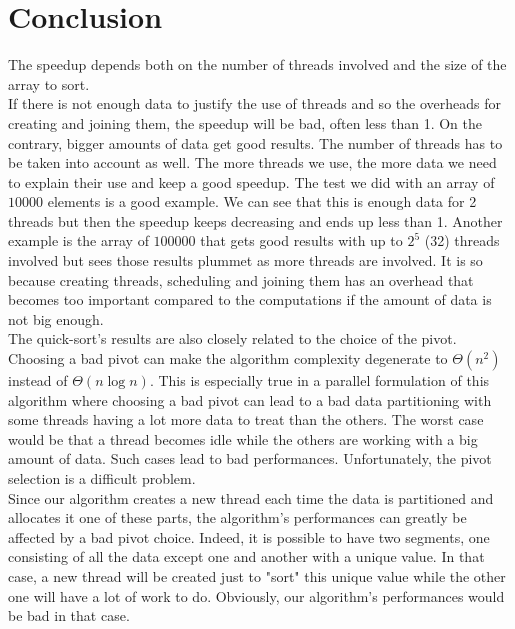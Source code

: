 \chapter{Conclusion}

The speedup depends both on the number of threads involved and the size of the array to sort.\\ 

If there is not enough data to justify the use of threads and so the overheads for creating and joining them, the speedup will be bad, often less than 1. On the contrary, bigger amounts of data get good results. The number of threads has to be taken into account as well. The more threads we use, the more data we need to explain their use and keep a good speedup. The test we did with an array of $10000$ elements is a good example. We can see that this is enough data for 2 threads but then the speedup keeps decreasing and ends up less than 1. Another example is the array of $100000$ that gets good results with up to $2^5$ (32) threads involved but sees those results plummet as more threads are involved. It is so because creating threads, scheduling and joining them has an overhead that becomes too important compared to the computations if the amount of data is not big enough.\\

The quick-sort's results are also closely related to the choice of the pivot. Choosing a bad pivot can make the algorithm complexity degenerate to $\Theta(n^2)$ instead of $\Theta(n\log n)$. This is especially true in a parallel formulation of this algorithm where choosing a bad pivot can lead to a bad data partitioning with some threads having a lot more data to treat than the others. The worst case would be that a thread becomes idle while the others are working with a big amount of data. Such cases lead to bad performances. Unfortunately, the pivot selection is a difficult problem.\\

Since our algorithm creates a new thread each time the data is partitioned and allocates it one of these parts, the algorithm's performances can greatly be affected by a bad pivot choice. Indeed, it is possible to have two segments, one consisting of all the data except one and another with a unique value. In that case, a new thread will be created just to "sort" this unique value while the other one will have a lot of work to do. Obviously, our algorithm's performances would be bad in that case. \\

